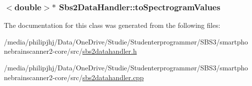 \hypertarget{classSbs2DataHandler_a2e2a930ac63df2480e02bfc2cc2d9c56}{
\subsubsection[{to\-Spectrogram\-Values}]{$<$double$>$$\ast$ Sbs2\-Data\-Handler\-::to\-Spectrogram\-Values\hspace{0.3cm}{\ttfamily [protected]}}}\label{classSbs2DataHandler_a2e2a930ac63df2480e02bfc2cc2d9c56}


The documentation for this class was generated from the following files\-:\begin{DoxyCompactItemize}
\item 
/media/philipjhj/\-Data/\-One\-Drive/\-Studie/\-Studenterprogrammør/\-S\-B\-S3/smartphonebrainscanner2-\/core/src/\hyperlink{sbs2datahandler_8h}{sbs2datahandler.\-h}\item 
/media/philipjhj/\-Data/\-One\-Drive/\-Studie/\-Studenterprogrammør/\-S\-B\-S3/smartphonebrainscanner2-\/core/src/\hyperlink{sbs2datahandler_8cpp}{sbs2datahandler.\-cpp}\end{DoxyCompactItemize}
